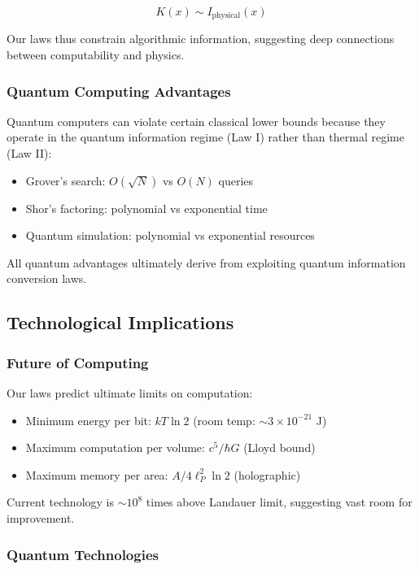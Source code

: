 \documentclass[11pt,a4paper]{article}
\theoremstyle{plain}
\theoremstyle{definition}
\theoremstyle{remark}
\begin{document}
\begin{equation}
K(x) \sim I_{\text{physical}}(x)
\end{equation}

Our laws thus constrain algorithmic information, suggesting deep connections between computability and physics.

\subsubsection{Quantum Computing Advantages}

Quantum computers can violate certain classical lower bounds because they operate in the quantum information regime (Law I) rather than thermal regime (Law II):

\begin{itemize}[leftmargin=*]
\item Grover's search: $O(\sqrt{N})$ vs $O(N)$ queries
\item Shor's factoring: polynomial vs exponential time
\item Quantum simulation: polynomial vs exponential resources
\end{itemize}

All quantum advantages ultimately derive from exploiting quantum information conversion laws.

\subsection{Technological Implications}

\subsubsection{Future of Computing}

Our laws predict ultimate limits on computation:

\begin{itemize}[leftmargin=*]
\item Minimum energy per bit: $kT\ln 2$ (room temp: $\sim 3\times 10^{-21}$ J)
\item Maximum computation per volume: $c^5/\hbar G$ (Lloyd bound)
\item Maximum memory per area: $A/4\ell_P^2\ln 2$ (holographic)
\end{itemize}

Current technology is $\sim 10^{8}$ times above Landauer limit, suggesting vast room for improvement.

\subsubsection{Quantum Technologies}
\end{document}
